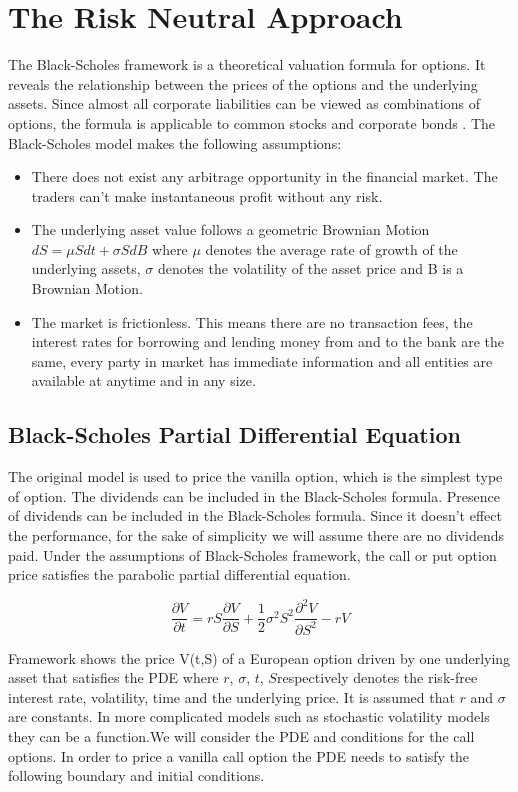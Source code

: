\documentclass[12pt, oneside]{book}
\theoremstyle{plain}
\theoremstyle{definition}
\begin{document}
\section{The Risk Neutral Approach}
The Black-Scholes framework is a theoretical valuation formula for options. It reveals the relationship between the prices of the options and the underlying assets. Since almost all corporate liabilities can be viewed as combinations of options, the formula is applicable to common stocks and corporate bonds \cite{BS}. The Black-Scholes model makes the following assumptions:
\begin{itemize}
\item There does not exist any arbitrage opportunity in the financial market.  The traders can’t make instantaneous profit without any risk.
\item The underlying asset value follows a geometric Brownian Motion $dS = \mu S dt + \sigma S dB $ where $\mu$ denotes the average rate of growth of the underlying assets, $\sigma$ denotes the volatility of the asset price and B is a Brownian Motion.
\item The market is frictionless.  This means there are no transaction fees, the interest rates for borrowing and lending money from and to the bank are the same, every party  in  market  has  immediate  information  and  all  entities  are  available  at  anytime and in any size.
\end{itemize}

\subsection{Black-Scholes Partial Differential Equation}
The original model is used to price the vanilla  option, which is the simplest type of option. The dividends can be included in the Black-Scholes formula. Presence of dividends can be included in the Black-Scholes formula. Since it doesn't effect the performance, for the sake of simplicity we will assume there are no dividends paid. Under the assumptions of Black-Scholes framework, the call or put option price satisfies the parabolic partial differential equation.

\begin{equation}
\frac{\partial V}{\partial t} = rS\frac{\partial V}{\partial S}+\frac{1}{2} \sigma^2 S^2 \frac{\partial^2 V}{\partial S^2} - rV
\end{equation}

Framework shows the  price V(t,S)  of  a  European  option  driven  by  one underlying asset that satisfies the PDE where $r$, $\sigma$, $t$, $S$respectively denotes the risk-free interest rate, volatility, time and the underlying price.  It is assumed that $r$ and $\sigma$ are constants. In more complicated models such as stochastic volatility models they can be a function.We will consider the  PDE and conditions for the call options.  In order to price a vanilla call option the PDE needs to satisfy the following boundary and initial conditions. 
\end{document}
